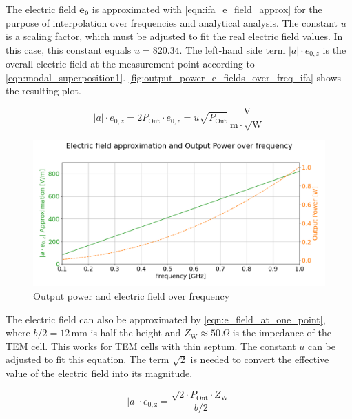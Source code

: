 The electric field $\mathbf{e_0}$ is approximated with \autoref{eqn:ifa_e_field_approx} for the purpose of interpolation over frequencies and analytical analysis. The constant $u$ is a scaling factor, which must be adjusted to fit the real electric field values. In this case, this constant equals $u=820.34$. The left-hand side term $|a|\cdot e_{0,z}$ is the overall electric field at the measurement point according to \autoref{eqn:modal_superposition1}. \autoref{fig:output_power_e_fields_over_freq_ifa} shows the resulting plot. 

\begin{equation}
    |a|\cdot e_{0,z}=2P_\mathrm{Out}\cdot e_{0,z}=u\sqrt{P_\mathrm{Out}}\,\mathrm{\frac{V}{m\cdot\sqrt{W}}}
    \label{eqn:ifa_e_field_approx}
\end{equation}

\begin{figure}[h]
    \centering
    \includegraphics[width=1\linewidth]{Documentation//content//30_simulations//img/output_power_e_fields_over_freq_ifa.png}
    \caption{Output power and electric field over frequency}
    \label{fig:output_power_e_fields_over_freq_ifa}
\end{figure}

The electric field can also be approximated by \autoref{eqn:e_field_at_one_point}, where $b/2=12\,\mathrm{mm}$ is half the height and $Z_\mathrm{W}\approx50\,\Omega$ is the impedance of the TEM cell. This works for TEM cells with thin septum. The constant $u$ can be adjusted to fit this equation. The term $\sqrt{2}$ is needed to convert the effective value of the electric field into its magnitude.

\begin{equation}
    |a|\cdot e_{\mathrm{0,z}}=\frac{\sqrt{2\cdot P_\mathrm{Out}\cdot Z_\mathrm{W}}}{b/2}
    \label{eqn:e_field_at_one_point}
\end{equation}

